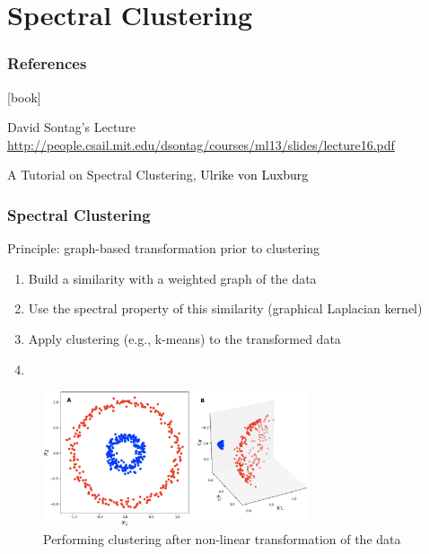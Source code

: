 \section{Spectral Clustering}

\begin{frame} 
  \frametitle{References}

    \begin{thebibliography}{99}
      [book]

     David Sontag's Lecture
    \newblock \url{http://people.csail.mit.edu/dsontag/courses/ml13/slides/lecture16.pdf}
    
     A Tutorial on Spectral Clustering, 
    \newblock \textcolor{black}{Ulrike von Luxburg}

    \end{thebibliography}

\end{frame}

\begin{frame}
  \frametitle{Spectral Clustering}
  
  \begin{block}{Principle: graph-based transformation prior to clustering} 
    \begin{enumerate}
      \item Build a similarity with a weighted graph of the data 
      \item Use the spectral property of this similarity (graphical Laplacian \rsa kernel)
      \item Apply clustering (e.g., k-means) to the transformed data 
      \item 
    \end{enumerate}
  \end{block}

  \begin{figure}[ht]
    \centering
    \includegraphics[height=4cm]{figures/kernel_trick2}
    \caption{Performing clustering after non-linear transformation of the data }
  \end{figure}

\end{frame}

